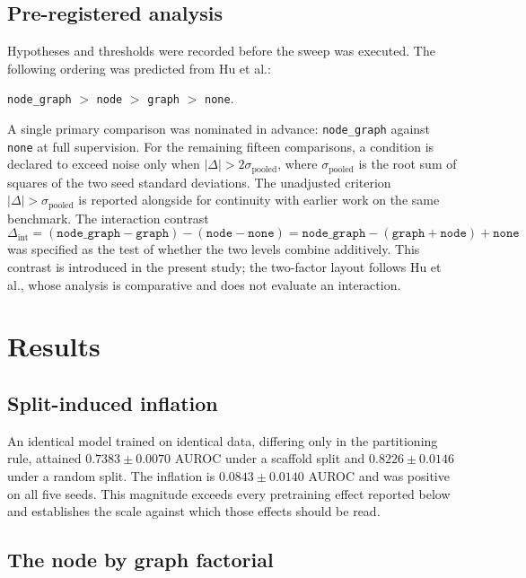 \documentclass[11pt,a4paper]{article}
\begin{document}
\subsection{Pre-registered analysis}

Hypotheses and thresholds were recorded before the sweep was executed. The
following ordering was predicted from Hu et al.:
\begin{center}
\texttt{node\_graph} $>$ \texttt{node} $>$ \texttt{graph} $>$ \texttt{none}.
\end{center}

A single primary comparison was nominated in advance: \texttt{node\_graph}
against \texttt{none} at full supervision. For the remaining fifteen
comparisons, a condition is declared to exceed noise only when
$|\Delta| > 2\sigma_{\mathrm{pooled}}$, where $\sigma_{\mathrm{pooled}}$ is the
root sum of squares of the two seed standard deviations. The unadjusted
criterion $|\Delta| > \sigma_{\mathrm{pooled}}$ is reported alongside for
continuity with earlier work on the same benchmark. The interaction contrast
\begin{equation}
\Delta_{\mathrm{int}}
= (\texttt{node\_graph} - \texttt{graph}) - (\texttt{node} - \texttt{none})
= \texttt{node\_graph} - (\texttt{graph} + \texttt{node}) + \texttt{none}
\label{eq:int}
\end{equation}
was specified as the test of whether the two levels combine additively. This
contrast is introduced in the present study; the two-factor layout follows
Hu et al., whose analysis is comparative and does not evaluate an interaction.

\section{Results}

\subsection{Split-induced inflation}
\label{sec:inflation}

An identical model trained on identical data, differing only in the partitioning
rule, attained $0.7383 \pm 0.0070$ AUROC under a scaffold split and
$0.8226 \pm 0.0146$ under a random split. The inflation is
$0.0843 \pm 0.0140$ AUROC and was positive on all five seeds. This magnitude
exceeds every pretraining effect reported below and establishes the scale
against which those effects should be read.

\subsection{The node by graph factorial}
\end{document}
